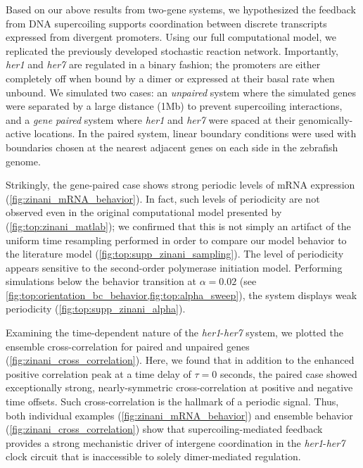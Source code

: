 \documentclass[11pt]{article}
\begin{document}
Based on our above results from two-gene systems, we hypothesized the feedback from DNA supercoiling supports coordination between discrete transcripts expressed from divergent promoters. Using our full computational model, we replicated the previously developed stochastic reaction network. Importantly, \textit{her1} and \textit{her7} are regulated in a binary fashion; the promoters are either completely off when bound by a dimer or expressed at their basal rate when unbound. We simulated two cases: an \emph{unpaired} system where the simulated genes were separated by a large distance (1Mb) to prevent supercoiling interactions, and a \emph{gene paired} system where \textit{her1} and \textit{her7} were spaced at their genomically-active locations. In the paired system, linear boundary conditions were used with boundaries chosen at the nearest adjacent genes on each side in the zebrafish genome.

Strikingly, the gene-paired case shows strong periodic levels of mRNA expression (\cref{fig:zinani_mRNA_behavior}). In fact, such levels of periodicity are not observed even in the original computational model presented by \textcite{zinaniPairingSegmentationClock2021} (\cref{fig:top:zinani_matlab}); we confirmed that this is not simply an artifact of the uniform time resampling performed in order to compare our model behavior to the literature model (\cref{fig:top:supp_zinani_sampling}). The level of periodicity appears sensitive to the second-order polymerase initiation model. Performing simulations below the behavior transition at \(\alpha = 0.02\) (see \cref{fig:top:orientation_bc_behavior,fig:top:alpha_sweep}), the system displays weak periodicity (\cref{fig:top:supp_zinani_alpha}). 

Examining the time-dependent nature of the \textit{her1}-\textit{her7} system, we plotted the ensemble cross-correlation for paired and unpaired genes (\cref{fig:zinani_cross_correlation}). Here, we found that in addition to the enhanced positive correlation peak at a time delay of \(\tau = 0\) seconds, the paired case showed exceptionally strong, nearly-symmetric cross-correlation at positive and negative time offsets. Such cross-correlation is the hallmark of a periodic signal. Thus, both individual examples (\cref{fig:zinani_mRNA_behavior}) and ensemble behavior (\cref{fig:zinani_cross_correlation}) show that supercoiling-mediated feedback provides a strong mechanistic driver of intergene coordination in the \textit{her1}-\textit{her7} clock circuit that is inaccessible to solely dimer-mediated regulation.
\end{document}
